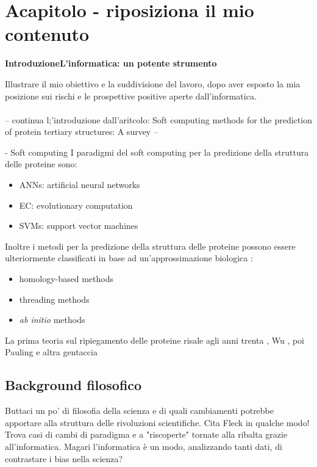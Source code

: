 \chapter{Acapitolo - riposiziona il mio contenuto}


\textbf{{\LARGE Introduzione\newline\newline L'informatica: un potente strumento}}
\vspace{1cm}

Illustrare il mio obiettivo e la suddivisione del lavoro, dopo aver esposto la mia posizione sui rischi e le prospettive positive aperte dall'informatica.\\\\


-- continua l;'introduzione dall'aritcolo: Soft computing methods for the prediction of protein tertiary
structures: A survey --



- Soft computing
I paradigmi del soft computing per la predizione della struttura delle proteine sono:
\begin{itemize}
\item ANNs: artificial neural networks
\item EC: evolutionary computation
\item SVMs: support vector machines
\end{itemize}
Inoltre i metodi per la predizione della struttura delle proteine possono essere ulteriormente classificati in base ad un'approssimazione biologica \cite{marquez2015soft}:
\begin{itemize}
	\item homology-based methods
	\item threading methods
	\item \textit{ab initio } methods
\end{itemize}

La prima teoria sul ripiegamento delle proteine risale agli anni trenta , Wu \cite{wu1931studies}, poi Pauling e altra gentaccia

\section{Background filosofico}
Buttaci un po' di filosofia della scienza e di quali cambiamenti potrebbe apportare alla struttura delle rivoluzioni scientifiche. Cita Fleck in qualche modo!
Trova casi di cambi di paradigma e a "riscoperte" tornate alla ribalta grazie all'informatica. Magari l'informatica è un modo, analizzando tanti dati, di contrastare i bias nella scienza?


